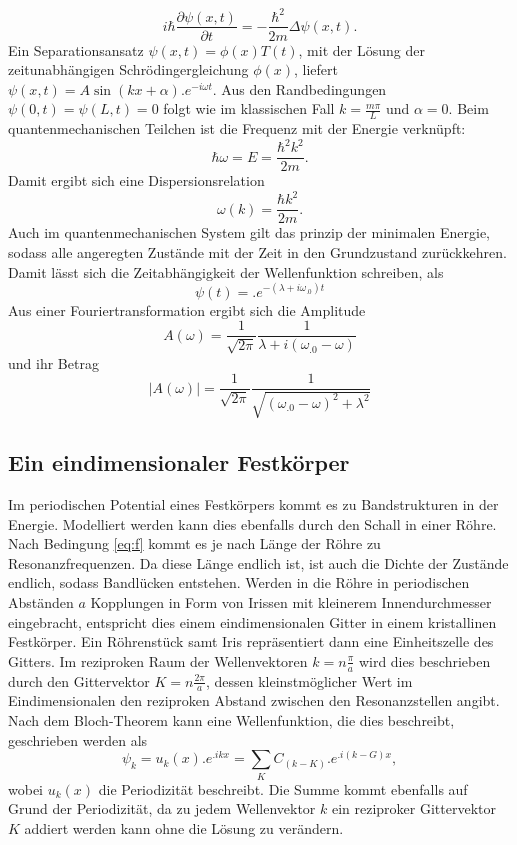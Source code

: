 \[
i\hbar\frac{\partial\psi(x,t)}{\partial t}=-\frac{\hbar^2}{2m}\Delta\psi(x,t)\text{.}
\]
Ein Separationsansatz $\psi(x,t)=\phi(x)T(t)$, mit der Lösung der zeitunabhängigen Schrödingergleichung $\phi(x)$, liefert
$\psi(x,t)=A\sin(kx+\alpha) .e^{-i\omega t}$. Aus den Randbedingungen 
$\psi(0,t)=\psi(L,t)=0$ folgt wie im klassischen Fall $k=\frac{m\pi}{L}$ und $\alpha=0$.
Beim quantenmechanischen Teilchen ist die Frequenz mit der Energie verknüpft:
\[
\hbar\omega=E=\frac{\hbar^2k^2}{2m}\text{.}
\]
Damit ergibt sich eine Dispersionsrelation
\begin{equation}
\omega(k)=\frac{\hbar k^2}{2m}\text{.}\label{eq:omega_q}
\end{equation}
Auch im quantenmechanischen System gilt das prinzip der minimalen Energie, sodass alle angeregten Zustände mit der Zeit in den Grundzustand zurückkehren. Damit lässt sich die Zeitabhängigkeit der Wellenfunktion schreiben, als
\[
\psi(t)=.e^{-(\lambda+i\omega_.0)t}
\]
Aus einer Fouriertransformation ergibt sich die Amplitude
\[
A(\omega)=\frac{1}{\sqrt{2\pi}}\frac{1}{\lambda+i(\omega_.0-\omega)}
\]
und ihr Betrag
\begin{equation}
|A(\omega)|=\frac{1}{\sqrt{2\pi}}\frac{1}{\sqrt{(\omega_.0-\omega)^2+\lambda^2}}
\end{equation}

\subsection{Ein eindimensionaler Festkörper}

Im periodischen Potential eines Festkörpers kommt es zu Bandstrukturen in der Energie. Modelliert werden kann dies ebenfalls durch den Schall in einer Röhre. Nach Bedingung \eqref{eq:f} kommt es je nach Länge der Röhre zu Resonanzfrequenzen. Da diese Länge endlich ist, ist auch die Dichte der Zustände endlich, sodass Bandlücken entstehen. Werden in die Röhre in periodischen Abständen $a$ Kopplungen in Form von Irissen mit kleinerem Innendurchmesser eingebracht, entspricht dies einem eindimensionalen Gitter in einem kristallinen Festkörper. Ein Röhrenstück samt Iris repräsentiert dann eine Einheitszelle des Gitters. Im reziproken Raum der Wellenvektoren $k=n\frac{\pi}{a}$ wird dies beschrieben durch den Gittervektor $K=n\frac{2\pi}{a}$, dessen kleinstmöglicher Wert im Eindimensionalen den reziproken Abstand zwischen den Resonanzstellen angibt.
Nach dem Bloch-Theorem kann eine Wellenfunktion, die dies beschreibt, geschrieben werden als
\[
\psi_k=u_k(x) .e^{.i k x}=\sum_K C_{(k-K)} .e^{.i (k-G)x},
\]
wobei $u_k(x)$ die Periodizität beschreibt. Die Summe kommt ebenfalls auf Grund der Periodizität, da zu jedem Wellenvektor $k$ ein reziproker Gittervektor $K$ addiert werden kann ohne die Lösung zu verändern.

